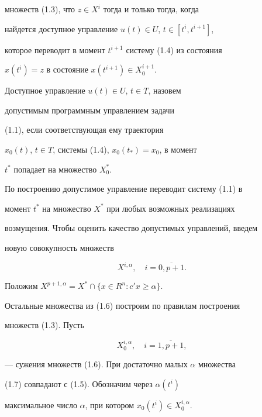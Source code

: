 множеств (1.3), что $z \in X^i$ тогда и только тогда, когда


найдется доступное управление $u(t) \in U$, $t \in [t^i,t^{i+1}]$,


которое переводит в момент $t^{i+1}$ систему (1.4) из состояния


$x(t^i)=z$ в состояние $x(t^{i+1}) \in X^{i+1}_0$.





Доступное управление $u(t) \in U$, $t \in T$, назовем


допустимым программным управлением задачи


(1.1), если соответствующая ему траектория


$x_0(t)$, $t \in T$, системы (1.4), $x_0(t_*)=x_0$, в момент


$t^*$ попадает на множество $X_0^*$.





По построению допустимое управление переводит систему (1.1) в


момент $t^*$ на множество $X^*$ при любых возможных реализациях


возмущения. Чтобы оценить качество допустимых управлений, введем


новую совокупность множеств


\begin{equation}


X^{i,\alpha},\quad i =\overline{0,p+1}.


\end{equation}


Положим $X^{p+1,\alpha}=X^* \cap \{x \in R^n:c'x \ge \alpha\}$.


Остальные множества из (1.6) построим по правилам построения


множеств (1.3). Пусть


\begin{equation}


X^{i,\alpha}_0,\quad i =\overline{1,p+1},


\end{equation}


--- сужения множеств (1.6). При достаточно малых $\alpha$ множества


(1.7) совпадают с (1.5). Обозначим через $\alpha (t^i)$


максимальное число $\alpha$, при котором $x_0(t^i) \in


X^{i,\alpha}_{0}$.





